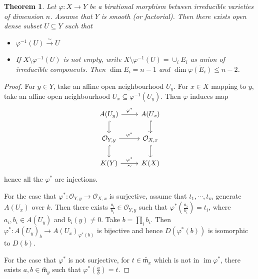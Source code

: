 \documentclass{ctexart}
\newtheorem{theorem}{Theorem}[section]
\newcommand{\im}{\operatorname{im}}
\begin{document}
\begin{theorem}
    Let $\varphi: X \rightarrow Y$ be a birational morphism between irreducible varieties of dimension $n$.
    Assume that $Y$ is smooth (or factorial).
    Then there exists open dense subset $U \subseteq Y$ such that 
    \begin{itemize}
        \item $\varphi^{-1}(U) \overset{\sim}{\rightarrow} U$
        \item If $X \setminus \varphi^{-1}(U)$ is not empty, write $X \setminus \varphi^{-1}(U) = \cup_{i} E_{i}$ as union of irreducible components.
        Then $\dim E_{i} = n - 1$ and $\dim \overline{\varphi(E_{i})} \le n - 2$.
    \end{itemize}
    \label{Theorem 5.3}
\end{theorem}
\begin{proof}
    For $y\in Y$, take an affine open neighbourhood $U_{y}$.
    For $x\in X$ mapping to $y$, take an affine open neighbourhood $U_{x} \subseteq \varphi^{-1}(U_{y})$.
    Then $\varphi$ induces map
    \begin{equation}
        \begin{tikzcd}
            A(U_{y}) \arrow[r, "\varphi^{\ast}"] \arrow[d, hookrightarrow] &
            A(U_{x}) \arrow[d, hookrightarrow] \\
            \mathcal{O}_{Y, y} \arrow[r, "\varphi^{\ast}"] \arrow[d, hookrightarrow] &
            \mathcal{O}_{X, x} \arrow[d, hookrightarrow] \\
            K(Y) \arrow[r, "\varphi^{\ast}", "\sim" swap] &
            K(X)
        \end{tikzcd}
    \end{equation}
    hence all the $\varphi^{\ast}$ are injections.
    \par
    For the case that $\varphi^{\ast}: \mathcal{O}_{Y, y} \rightarrow \mathcal{O}_{X, x}$ is surjective,
    assume that $t_{1}, \cdots, t_{m}$ generate $A(U_{x})$ over $k$.
    Then there exists $\frac{a_{i}}{b_{i}}\in \mathcal{O}_{Y, y}$ such that $\varphi^{\ast}(\frac{a_{i}}{b_{i}}) = t_{i}$,
    where $a_{i},b_{i}\in A(U_{y})$ and $b_{i}(y) \neq 0$.
    Take $b = \prod_{i} b_{i}$.
    Then $\varphi^{\ast}: A(U_{y})_{b} \rightarrow A(U_{x})_{\varphi^{\ast}(b)}$ is bijective and hence $D(\varphi^{\ast}(b))$ is isomorphic to $D(b)$.
    \par
    For the case that $\varphi^{\ast}$ is not surjective, for $t\in \widetilde{\mathfrak{m}_{x}}$ which is not in $\im \varphi^{\ast}$,
    there exists $a,b\in \widetilde{\mathfrak{m}_{y}}$ such that $\varphi^{\ast}(\frac{a}{b}) = t$.

\end{proof}
\end{document}
